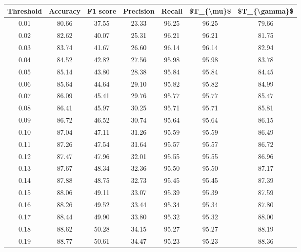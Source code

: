 \begin{tabular}{|c|c|c|c|c|c|c|}
\hline
 Threshold &  Accuracy &  F1 score &  Precision &  Recall &  \$T\_\{\textbackslash mu\}\$ &  \$T\_\{\textbackslash gamma\}\$ \\
\hline
      0.01 &     80.66 &     37.55 &      23.33 &   96.25 &      96.25 &         79.66 \\
      0.02 &     82.62 &     40.07 &      25.31 &   96.21 &      96.21 &         81.75 \\
      0.03 &     83.74 &     41.67 &      26.60 &   96.14 &      96.14 &         82.94 \\
      0.04 &     84.52 &     42.82 &      27.56 &   95.98 &      95.98 &         83.78 \\
      0.05 &     85.14 &     43.80 &      28.38 &   95.84 &      95.84 &         84.45 \\
      0.06 &     85.64 &     44.64 &      29.10 &   95.82 &      95.82 &         84.99 \\
      0.07 &     86.09 &     45.41 &      29.76 &   95.77 &      95.77 &         85.47 \\
      0.08 &     86.41 &     45.97 &      30.25 &   95.71 &      95.71 &         85.81 \\
      0.09 &     86.72 &     46.52 &      30.74 &   95.64 &      95.64 &         86.15 \\
      0.10 &     87.04 &     47.11 &      31.26 &   95.59 &      95.59 &         86.49 \\
      0.11 &     87.26 &     47.54 &      31.64 &   95.57 &      95.57 &         86.72 \\
      0.12 &     87.47 &     47.96 &      32.01 &   95.55 &      95.55 &         86.96 \\
      0.13 &     87.67 &     48.34 &      32.36 &   95.50 &      95.50 &         87.17 \\
      0.14 &     87.88 &     48.75 &      32.73 &   95.45 &      95.45 &         87.39 \\
      0.15 &     88.06 &     49.11 &      33.07 &   95.39 &      95.39 &         87.59 \\
      0.16 &     88.26 &     49.52 &      33.44 &   95.34 &      95.34 &         87.80 \\
      0.17 &     88.44 &     49.90 &      33.80 &   95.32 &      95.32 &         88.00 \\
      0.18 &     88.62 &     50.28 &      34.15 &   95.27 &      95.27 &         88.19 \\
      0.19 &     88.77 &     50.61 &      34.47 &   95.23 &      95.23 &         88.36 \\

\end{tabular}
